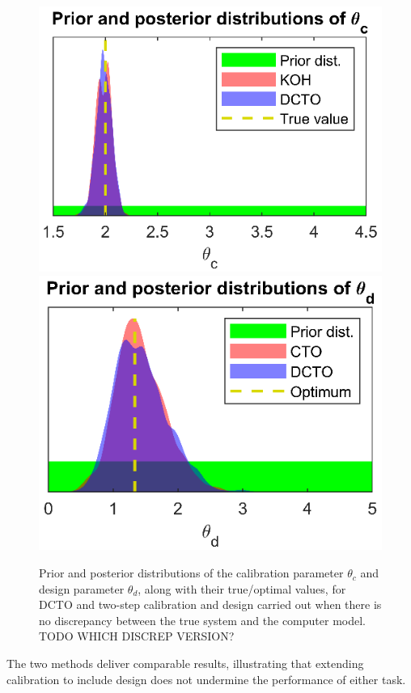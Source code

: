 \documentclass[12pt]{article}
\begin{document}
\begin{figure}
\centering
\includegraphics[scale=0.85]{FIG_dual_calib_post_theta1-d0}
\includegraphics[scale=0.85]{FIG_dual_calib_post_theta2-d0}
\captionsetup{width=.85\linewidth}
\caption{Prior and posterior distributions of the calibration parameter $\theta_c$ and design parameter $\theta_d$, along with their true/optimal values, for DCTO and two-step calibration and design carried out when there is no discrepancy between the true system and the computer model. TODO WHICH DISCREP VERSION?}
\label{fig:no_discrep_results}
\end{figure}
%
The two methods deliver comparable results, illustrating that extending calibration to include design does not undermine the performance of either task.
\end{document}
